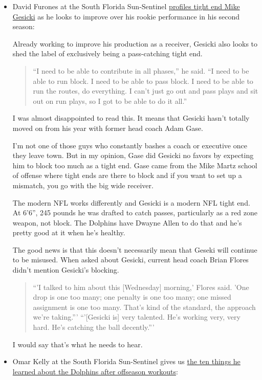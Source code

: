 \documentclass[11pt]{article}
\begin{document}
\begin{itemize}
\item  David Furones at the South Florida Sun-Sentinel \href{https://www.sun-sentinel.com/sports/miami-dolphins/fl-sp-dolphins-separate1-20190606-q3rtuhhmrbct5gueuj3cnxdlmu-story.html}{profiles tight end Mike Gesicki} as he looks to improve over his rookie performance in his second season:

Already working to improve his production as a receiver, Gesicki also looks to shed the label of exclusively being a pass-catching tight end.

\begin{quote}
“I need to be able to contribute in all phases,” he said. “I need to be able to run block. I need to be able to pass block. I need to be able to run the routes, do everything. I can’t just go out and pass plays and sit out on run plays, so I got to be able to do it all.”
\end{quote}

I was almost disappointed to read this.  It means that Gesicki hasn't totally moved on from his year with former head coach Adam Gase.

I'm not one of those guys who constantly bashes a coach or executive once they leave town.  But in my opinion, Gase did Gesicki no favors by expecting him to block too much as a tight end.  Gase came from the Mike Martz school of offense where tight ends are there to block and if you want to set up a mismatch, you go with the big wide receiver.

The modern NFL works differently and Gesicki is a modern NFL tight end.  At 6'6'', 245 pounds he was drafted to catch passes, particularly as a red zone weapon, not block.  The Dolphins have Dwayne Allen to do that and he's pretty good at it when he's healthy.

The good news is that this doesn’t necessarily mean that Geseki will continue to be misused. When asked about Gesicki, current head coach Brian Flores didn't mention Gesicki's blocking.

\begin{quote}
  ``'I talked to him about this [Wednesday] morning,' Flores said. 'One drop is one too many; one penalty is one too many; one missed assignment is one too many. That’s kind of the standard, the approach we’re taking.'''
  ``'[Gesicki is] very talented. He’s working very, very hard. He’s catching the ball decently.'''
\end{quote}

I would say that's what he needs to hear.
\item Omar Kelly at the South Florida Sun-Sentinel gives us \href{https://www.sun-sentinel.com/sports/miami-dolphins/fl-sp-miami-dolphins-10-things-we-learned-offseason-20190607-nstletyi5vfj5gj7qo63gb4jjq-photogallery.html}{the ten things he learned about the Dolphins after offseason workouts}:


\end{itemize}
\end{document}
